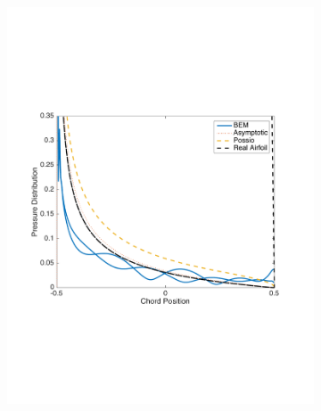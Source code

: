 \documentclass{article}
\begin{document}
\begin{figure}[h]
\centering
\begin{subfigure}{0.3\textwidth}
	\centering
	\includegraphics[width = \textwidth, height=0.2\textheight]{pressure_k10mag}
\end{subfigure}%
\begin{subfigure}{0.3\textwidth}
	\centering

\end{subfigure}
\end{figure}
\end{document}
